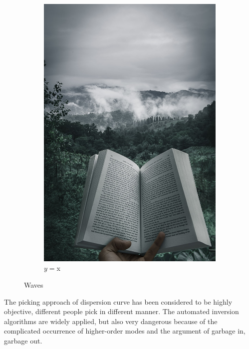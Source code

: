 \begin{figure}[!t]
\begin{subfigure}[b]{0.3\textwidth}
        \includegraphics[width=\textwidth]{images/f}
        \caption{$y=$x}
        \label{fig:wave1}
    \end{subfigure}
    \hfill
    \caption{Waves}
    \label{fig:three waves}
\end{figure}    

The picking approach of dispersion curve has been considered to be highly objective, different people pick in different manner. The automated inversion algorithms are widely applied, but also very dangerous because of the complicated occurrence of higher-order modes and the argument of garbage in, garbage out.

